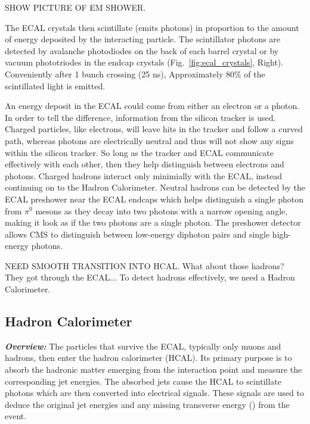 SHOW PICTURE OF EM SHOWER.

The ECAL crystals then scintillate (emits photons) in proportion to the amount of energy deposited by the interacting particle. 
The scintillator photons are detected by avalanche photodiodes on the back of each barrel crystal or by vacuum phototriodes in the endcap crystals (Fig.~\ref{fig:ecal_crystals}, Right).
Conveniently after 1 bunch crossing (25 ns), Approximately 80\% of the scintillated light is emitted.

An energy deposit in the ECAL could come from either an electron or a photon.
In order to tell the difference, information from the silicon tracker is used.
Charged particles, like electrons, will leave hits in the tracker and follow a curved path, whereas photons are electrically neutral and thus will not show any signs within the silicon tracker.
So long as the tracker and ECAL communicate effectively with each other, then they help distinguish between electrons and photons.
Charged hadrons interact only minimially with the ECAL, instead continuing on to the Hadron Calorimeter.
Neutral hadrons can be detected by the ECAL preshower near the ECAL endcaps which helps distinguish a single photon from $\pi^{0}$ mesons as they decay into two photons with a narrow opening angle, making it look as if the two photons are a single photon.
The preshower detector allows CMS to distinguish between low-energy diphoton pairs and single high-energy photons.

NEED SMOOTH TRANSITION INTO HCAL. What about those hadrons? They got through the ECAL... To detect hadrons effectively, we need a Hadron Calorimeter.

\subsection{Hadron Calorimeter}
\label{sec:hcal}

\textit{\textbf{Overview:}}
The particles that survive the ECAL, typically only muons and hadrons, then enter the hadron calorimeter (HCAL).
Its primary purpose is to absorb the hadronic matter emerging from the interaction point and measure the corresponding jet energies.
The absorbed jets cause the HCAL to scintillate photons which are then converted into electrical signals.
These signals are used to deduce the original jet energies and any missing transverse energy (\MET) from the event.

